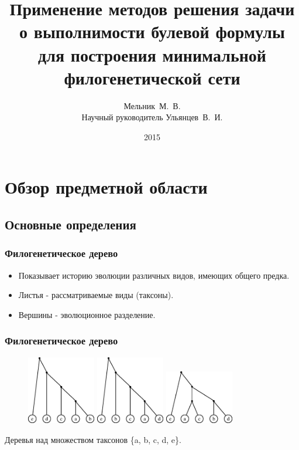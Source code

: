 \documentclass[hyperref={unicode}]{beamer}
\title{Применение методов решения задачи о выполнимости булевой формулы для построения минимальной филогенетической сети}
\author[]{Мельник~М.~В.\\
Научный руководитель Ульянцев~В.~И.}
\institute{Университет~ИТМО}
\date[]{2015}
\begin{document}
\begin{frame}
  \titlepage
\end{frame}


\section{Обзор предметной области}

\subsection{Основные определения}

\begin{frame}
\frametitle{Филогенетическое дерево}

\begin{itemize}
	\item Показывает историю эволюции различных видов, имеющих общего предка.
	\item Листья - рассматриваемые виды (таксоны).
	\item Вершины - эволюционное разделение.	
\end{itemize}

\end{frame} 


\begin{frame}
\frametitle{Филогенетическое дерево}

\centering

\begin{figure}[t]
	\includegraphics[width=3cm]{img/inp1.eps}
	\hspace{5mm}
	\includegraphics[width=3cm]{img/inp2.eps}
	\hspace{5mm}
	\includegraphics[width=3cm]{img/inp3.eps}
\end{figure}

Деревья над множеством таксонов \{a, b, c, d, e\}.

\end{frame}
\end{document}

